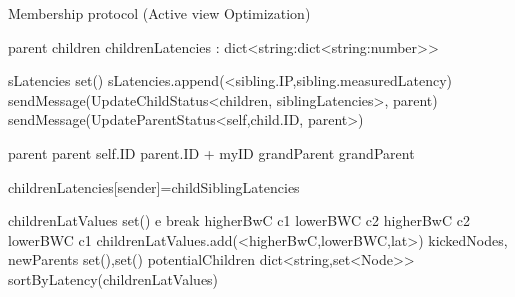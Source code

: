 \begin{algorithm}
    \begin{algorithmic}[1]

        \caption{Membership protocol (Active view Optimization)}

        \asdstate
            \State parent 
            \State children 
            \State childrenLatencies : dict<string:dict<string:number>>
        \asdend

                \State sLatencies \asdassign set()
                    \State sLatencies.append(<sibling.IP,sibling.measuredLatency)
                \EndFor
                \State sendMessage(UpdateChildStatus<children, siblingLatencies>, parent)
            \EndIf
                \State sendMessage(UpdateParentStatus<self,child.ID, parent>)
            \EndFor
        \asdend

                \State parent \asdassign parent
                \State self.ID \asdassign parent.ID + myID
                \State grandParent \asdassign grandParent
            \EndIf
        \asdend

                \State childrenLatencies[sender]=childSiblingLatencies
            \EndIf
        \asdend

            \State childrenLatValues \asdassign set()
                        e break
                    \EndIf
                    \State higherBwC \asdassign c1
                    \State lowerBWC \asdassign c2
                        \State higherBwC \asdassign c2
                        \State lowerBWC \asdassign c1
                    \EndIf
                    \State childrenLatValues.add(<higherBwC,lowerBWC,lat>)
                \EndFor
            \EndFor
            \State kickedNodes, newParents \asdassign set(),set()
            \State potentialChildren \asdassign dict<string,set<Node{>}{>}
            \State sortByLatency(childrenLatValues)


\end{algorithmic}
\end{algorithm}
